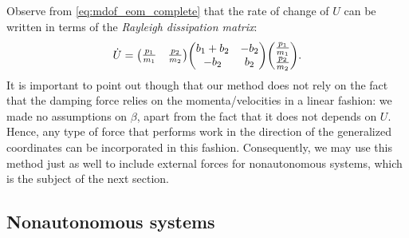 Observe from \cref{eq:mdof_eom_complete} that the rate of change of $U$ can be written in terms of the \emph{Rayleigh dissipation matrix}:
$$ \dot{U} = \mqty(\tfrac{p_1}{m_1} & \tfrac{p_2}{m_2}) \mqty(b_1 + b_2 & -b_2 \\ -b_2 & b_2) \mqty(\tfrac{p_1}{m_1} \\ \tfrac{p_2}{m_2}).$$
It is important to point out though that our method does not rely on the fact that the damping force relies on the momenta/velocities in a linear fashion: we made no assumptions on $\beta$, apart from the fact that it does not depends on $U$. Hence, any type of force that performs work in the direction of the generalized coordinates can be incorporated in this fashion. Consequently, we may use this method just as well to include external forces for nonautonomous systems, which is the subject of the next section.

\subsection{Nonautonomous systems}


